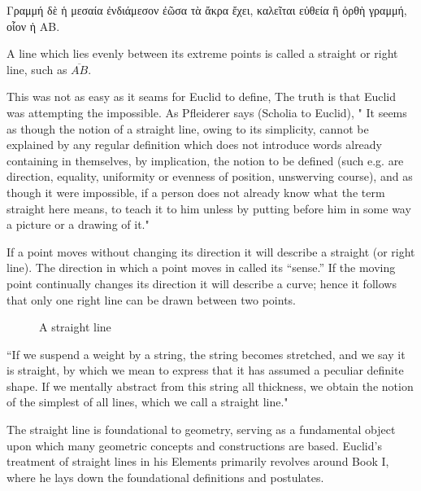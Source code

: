 
\begin{defin}
\textgreek{Γραμμή δὲ ἡ μεσαία ἐνδιάμεσον ἐῶσα τὰ ἄκρα ἔχει, καλεῖται εὐθεία ἢ ὀρθὴ γραμμή, οἷον ἡ ΑΒ.}

A line which lies evenly between its extreme points is called a straight or right line, such as $\overline{AB}$.
\end{defin}

This was not as easy as it seams for Euclid to define,  The truth is that Euclid was attempting the impossible. As Pfleiderer says (Scholia to Euclid), " It seems as though the notion of a straight line, owing to its simplicity, cannot be explained by any regular definition which does not introduce words already containing in themselves, by implication, the notion to be defined (such e.g. are direction, equality, uniformity or evenness of position, unswerving course), and as though it were impossible, if a person does not already know what the term straight here means, to teach it to him unless by putting before him in some way a picture or a drawing of it."

If a point moves without changing its direction it will describe a straight (or right line). The direction in which a point moves in called its “sense.” If the moving point continually changes its direction it will describe a curve; hence it follows that only one right line can be drawn between two points.

\begin{figure}[h]
	\begin{centering}
		\caption{A straight line}
	\end{centering}
\end{figure}

“If we suspend a weight by a string, the string becomes stretched, and we say it is straight, by which we mean to express that it has assumed a peculiar definite shape. If we mentally abstract from this string all thickness, we obtain the notion of the simplest of all lines, which we call a straight line."

The straight line is foundational to geometry, serving as a fundamental object upon which many geometric concepts and constructions are based. Euclid's treatment of straight lines in his Elements primarily revolves around Book I, where he lays down the foundational definitions and postulates.

